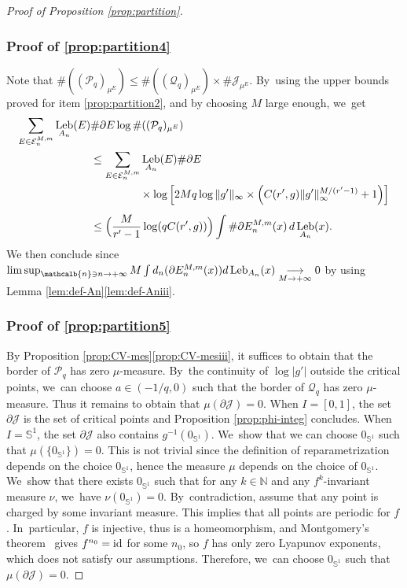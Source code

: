 \documentclass[10pt]{amsart}
\newcommand{\id}{\textup{id}}
\DeclareMathOperator{\Leb}{Leb}
\newcommand{\mcbn}{{\mathcalb{n}}}
\theoremstyle{definition}
\newcommand{\bbN}{{\mathbb{N}}}
\newcommand{\bbS}{{\mathbb{S}}}
\begin{document}
\begin{proof}[Proof of Proposition \ref{prop:partition}]
\subsubsection*{Proof of \eqref{prop:partition4}}
Note that $\# ((\mathcal{P}_q)_{\mu^E}) \leq \# ((\mathcal{Q}_q)_{\mu^E}) \times \# \mathcal{J}_{\mu^E}$. By~using the upper bounds proved for item \eqref{prop:partition2}, and by choosing $M$ large enough, we~get
\begin{align*}
\sum_{E \in \mathcal{E}_n^{M,m}} \Leb_{A_n}(E) &\# \partial E \log \# ((\mathcal{P}_q)_{\mu^E}) \\
&\leq \sum_{E \in \mathcal{E}_n^{M,m}} \Leb_{A_n}(E) \# \partial E\\
&\hspace{4.5em} {}\times\log \left [ 2M q \log \| g' \|_{\infty} \times \left (C(r',g) \| g' \|_{\infty}^{M / (r' - 1)} + 1 \right) \right ]\\[0.5em]
&\leq \Bigl (\frac{M}{r' - 1} \log (q C(r',g)) \Bigr) \int \# \partial E_n^{M,m}(x)\, d\Leb_{A_n}(x).
\end{align*}
We then conclude since $\limsup_{\mcbn \ni n \to +\infty} M \int d_n(\partial E_n^{M,m}(x)) d \Leb_{A_n}(x) \underset{M \to +\infty}{\longrightarrow} 0$ by using Lemma \ref{lem:def-An}\eqref{lem:def-Aniii}.

\subsubsection*{Proof of \eqref{prop:partition5}}
By Proposition \ref{prop:CV-mes}\eqref{prop:CV-mesiii}, it suffices to obtain that the border of $\mathcal{P}_q$ has zero $\mu$-measure. By~the continuity of $\log |g'|$ outside the critical points, we~can choose $a \in (- 1 /q, 0)$ such that the border of $\mathcal{Q}_q$ has zero $\mu$-measure.
Thus it remains to obtain that $\mu (\partial \mathcal{J}) = 0$.
When $I = [0,1]$, the set $\partial \mathcal{J}$ is the set of critical points and Proposition \ref{prop:phi-integ} concludes.
When $I = \bbS^1$, the set $\partial \mathcal{J}$ also contains $g^{-1}(0_{\bbS^1})$. We~show that we can choose $0_{\bbS^1}$ such that $\mu(\{ 0_{\bbS^1} \}) = 0$.
This is not trivial since the definition of reparametrization depends on the choice $0_{\bbS^1}$, hence the measure $\mu$ depends on the choice of $0_{\bbS^1}$. We~show that there exists $0_{\bbS^1}$ such that for any $k \in \bbN$ and any $f^k$-invariant measure $\nu$, we~have $\nu(0_{\bbS^1}) = 0$. By~contradiction, assume that any point is charged by some invariant measure.
This implies that all points are periodic for $f$. In~particular, $f$ is injective, thus is a homeomorphism, and Montgomery's theorem~\cite{Montgomery} gives $f^{n_0} = \id$ for some $n_0$, so $f$ has only zero Lyapunov exponents, which does not satisfy our assumptions.
Therefore, we~can choose $0_{\bbS^1}$ such that $\mu(\partial \mathcal{J}) = 0$.
\end{proof}
\end{document}
